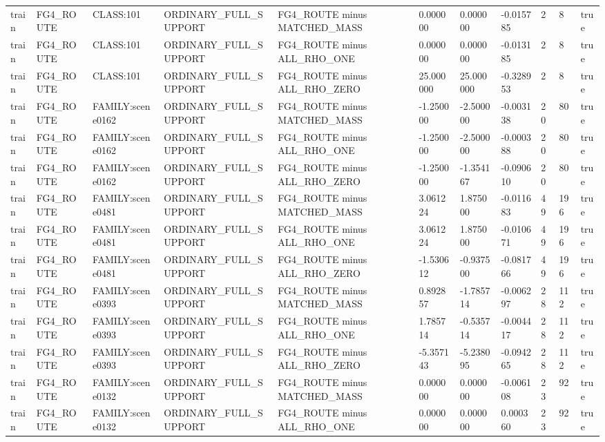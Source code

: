 \begin{tabular}{lllllllllll}
train & FG4\_ROUTE & CLASS:101 & ORDINARY\_FULL\_SUPPORT & FG4\_ROUTE minus MATCHED\_MASS & 0.000000 & 0.000000 & -0.015785 & 2 & 8 & true \\
train & FG4\_ROUTE & CLASS:101 & ORDINARY\_FULL\_SUPPORT & FG4\_ROUTE minus ALL\_RHO\_ONE & 0.000000 & 0.000000 & -0.013185 & 2 & 8 & true \\
train & FG4\_ROUTE & CLASS:101 & ORDINARY\_FULL\_SUPPORT & FG4\_ROUTE minus ALL\_RHO\_ZERO & 25.000000 & 25.000000 & -0.328953 & 2 & 8 & true \\
train & FG4\_ROUTE & FAMILY:scene0162 & ORDINARY\_FULL\_SUPPORT & FG4\_ROUTE minus MATCHED\_MASS & -1.250000 & -2.500000 & -0.003138 & 20 & 80 & true \\
train & FG4\_ROUTE & FAMILY:scene0162 & ORDINARY\_FULL\_SUPPORT & FG4\_ROUTE minus ALL\_RHO\_ONE & -1.250000 & -2.500000 & -0.000388 & 20 & 80 & true \\
train & FG4\_ROUTE & FAMILY:scene0162 & ORDINARY\_FULL\_SUPPORT & FG4\_ROUTE minus ALL\_RHO\_ZERO & -1.250000 & -1.354167 & -0.090610 & 20 & 80 & true \\
train & FG4\_ROUTE & FAMILY:scene0481 & ORDINARY\_FULL\_SUPPORT & FG4\_ROUTE minus MATCHED\_MASS & 3.061224 & 1.875000 & -0.011683 & 49 & 196 & true \\
train & FG4\_ROUTE & FAMILY:scene0481 & ORDINARY\_FULL\_SUPPORT & FG4\_ROUTE minus ALL\_RHO\_ONE & 3.061224 & 1.875000 & -0.010671 & 49 & 196 & true \\
train & FG4\_ROUTE & FAMILY:scene0481 & ORDINARY\_FULL\_SUPPORT & FG4\_ROUTE minus ALL\_RHO\_ZERO & -1.530612 & -0.937500 & -0.081766 & 49 & 196 & true \\
train & FG4\_ROUTE & FAMILY:scene0393 & ORDINARY\_FULL\_SUPPORT & FG4\_ROUTE minus MATCHED\_MASS & 0.892857 & -1.785714 & -0.006297 & 28 & 112 & true \\
train & FG4\_ROUTE & FAMILY:scene0393 & ORDINARY\_FULL\_SUPPORT & FG4\_ROUTE minus ALL\_RHO\_ONE & 1.785714 & -0.535714 & -0.004417 & 28 & 112 & true \\
train & FG4\_ROUTE & FAMILY:scene0393 & ORDINARY\_FULL\_SUPPORT & FG4\_ROUTE minus ALL\_RHO\_ZERO & -5.357143 & -5.238095 & -0.094265 & 28 & 112 & true \\
train & FG4\_ROUTE & FAMILY:scene0132 & ORDINARY\_FULL\_SUPPORT & FG4\_ROUTE minus MATCHED\_MASS & 0.000000 & 0.000000 & -0.006108 & 23 & 92 & true \\
train & FG4\_ROUTE & FAMILY:scene0132 & ORDINARY\_FULL\_SUPPORT & FG4\_ROUTE minus ALL\_RHO\_ONE & 0.000000 & 0.000000 & 0.000360 & 23 & 92 & true \\

\end{tabular}
